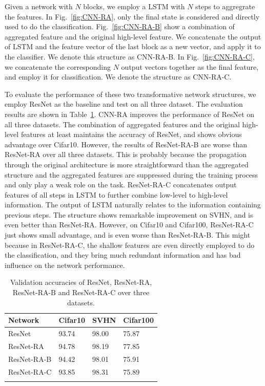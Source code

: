 \documentclass[conference]{IEEEtran}
\begin{document}
Given a network with $N$ blocks, we employ a LSTM with $N$ steps to aggregrate the features. In Fig.~\ref{fig:CNN-RA}, only the final state is considered and directly used to do the classification. Fig.~\ref{fig:CNN-RA-B} show a combination of aggregated feature and the original high-level feature. We concatenate the output of LSTM and the feature vector of the last block as a new vector, and apply it to the classifier. We denote this structure as CNN-RA-B. In Fig.~\ref{fig:CNN-RA-C}, we concatenate the corresponding $N$ output vectors together as the final feature, and employ it for classification. We denote the structure as CNN-RA-C.


To evaluate the performance of these two transformative network structures, we employ ResNet as the baseline and test on all three dataset. The evaluation results are shown in Table~\ref{table:RA-B-C}. CNN-RA improves the performance of ResNet on all three datasets. The combination of aggregated features and the original high-level features at least maintains the accuracy of ResNet, and shows obvious advantage over Cifar10. However, the results of ResNet-RA-B are worse than ResNet-RA over all three datasets. This is probably because the propagation through the original architecture is more straightforward than the aggregated structure and the aggregated features are suppressed during the training process and only play a weak role on the task. ResNet-RA-C concatenates output features of all steps in LSTM to further combine low-level to high-level information. The output of LSTM naturally relates to the information containing previous steps. The structure shows remarkable improvement on SVHN, and is even better than ResNet-RA. However, on Cifar10 and Cifar100, ResNet-RA-C just shows small advantage, and is even worse than ResNet-RA-B. This might because in ResNet-RA-C, the shallow features are even directly employed to do the classification, and they bring much redundant information and has bad influence on the network performance.
\setlength{\tabcolsep}{4pt}
\begin{table}
\begin{center}
\caption{Validation accuracies of ResNet, ResNet-RA, ResNet-RA-B and ResNet-RA-C over three datasets.}
\label{table:RA-B-C}
\begin{tabular}{l|lll}
\hline\noalign{\smallskip}
Network& Cifar10 & SVHN & Cifar100\\
\hline
ResNet &93.74  &98.00  &75.87  \\
ResNet-RA  &94.78  &98.19  &77.85  \\
ResNet-RA-B  &94.42  &98.01  &75.91  \\
ResNet-RA-C  &93.85  &98.31  &75.89  \\
\noalign{\smallskip}
\hline
\noalign{\smallskip}

\end{tabular}
\end{center}
\end{table}
\setlength{\tabcolsep}{1.4pt}
\end{document}
